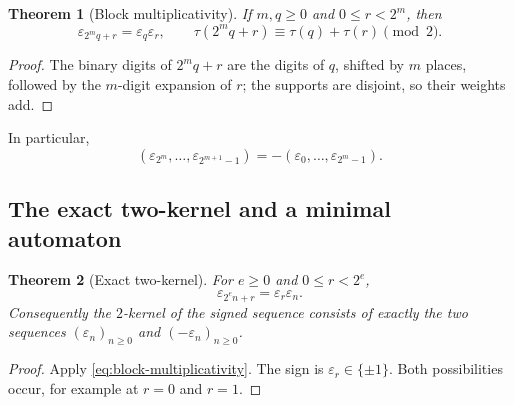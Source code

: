 \documentclass[11pt,oneside]{article}
\numberwithin{equation}{section}
\newtheorem{theorem}{Theorem}[section]
\theoremstyle{definition}
\theoremstyle{remark}
\newcommand{\eps}{\varepsilon}
\newcommand{\TM}{\tau}
\begin{document}
\begin{theorem}[Block multiplicativity]
If \(m,q\ge0\) and \(0\le r<2^m\), then
\begin{equation}
 \boxed{\eps_{2^mq+r}=\eps_q\eps_r,}
 \qquad
 \TM(2^mq+r)\equiv \TM(q)+\TM(r)\pmod2.
 \label{eq:block-multiplicativity}
\end{equation}
\end{theorem}

\begin{proof}
The binary digits of \(2^mq+r\) are the digits of \(q\), shifted by \(m\)
places, followed by the \(m\)-digit expansion of \(r\); the supports are
disjoint, so their weights add.
\end{proof}

In particular,
\begin{equation}
 (\eps_{2^m},\ldots,\eps_{2^{m+1}-1})
 =-(\eps_0,\ldots,\eps_{2^m-1}).
 \label{eq:complement-block}
\end{equation}

\subsection{The exact two-kernel and a minimal automaton}

\begin{theorem}[Exact two-kernel]
For \(e\ge0\) and \(0\le r<2^e\),
\begin{equation}
 \eps_{2^en+r}=\eps_r\eps_n.
 \label{eq:kernel-formula}
\end{equation}
Consequently the \(2\)-kernel of the signed sequence consists of exactly the
two sequences \((\eps_n)_{n\ge0}\) and \((-\eps_n)_{n\ge0}\).
\end{theorem}

\begin{proof}
Apply \cref{eq:block-multiplicativity}.  The sign is \(\eps_r\in\{\pm1\}\).
Both possibilities occur, for example at \(r=0\) and \(r=1\).
\end{proof}
\end{document}
